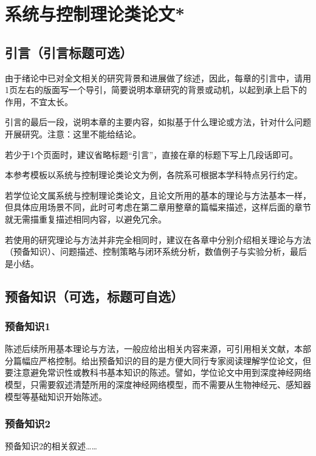 

\chapter{系统与控制理论类论文*}
\label{cha:command}


\section{引言（引言标题可选）}
\label{sec:cover}

由于绪论中已对全文相关的研究背景和进展做了综述，因此，每章的引言中，请用1页左右的版面写一个导引，简要说明本章研究的背景或动机，以起到承上启下的作用，不宜太长。

引言的最后一段，说明本章的主要内容，如拟基于什么理论或方法，针对什么问题开展研究。注意：这里不能给结论。

若少于1个页面时，建议省略标题“引言”，直接在章的标题下写上几段话即可。

本参考模板以系统与控制理论类论文为例，各院系可根据本学科特点另行约定。

若学位论文属系统与控制理论类论文，且论文所用的基本的理论与方法基本一样，但具体应用场景不同，此时可考虑在第二章用整章的篇幅来描述，这样后面的章节就无需描重复描述相同内容，以避免冗余。

若使用的研究理论与方法并非完全相同时，建议在各章中分别介绍相关理论与方法（预备知识）、问题描述、控制策略与闭环系统分析，数值例子与实验分析，最后是小结。


\section{预备知识（可选，标题可自选）}
\label{sec:font}

\subsection{预备知识1}
陈述后续所用基本理论与方法，一般应给出相关内容来源，可引用相关文献，本部分篇幅应严格控制。给出预备知识的目的是方便大同行专家阅读理解学位论文，但要注意避免常识性或教科书基本知识的陈述。譬如，学位论文中用到深度神经网络模型，只需要叙述清楚所用的深度神经网络模型，而不需要从生物神经元、感知器模型等基础知识开始陈述。

\subsection{预备知识2}
预备知识2的相关叙述……

